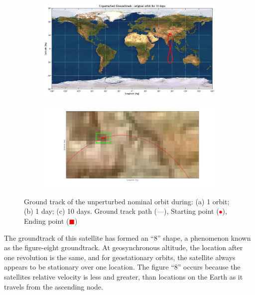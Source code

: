 \documentclass{article}
\newcommand{\reddashedline}{\textcolor{red}{---}}
\begin{document}
\begin{figure}[H]
	\vspace{1cm} %
	\begin{subfigure}[b]{0.45\textwidth}
		\includegraphics[width=\textwidth]{ug10d.eps}
		\caption{}
		\label{fig:1c}
	\end{subfigure}
	\hfill
	\begin{subfigure}[b]{0.45\textwidth}
		\includegraphics[width=\textwidth]{ugstartend.png}
		\caption{}
		\label{fig:1d}
	\end{subfigure}
	\caption{Ground track of the unperturbed nominal orbit during: (a) 1 orbit; (b) 1 day; (c) 10 days. Ground track path (\reddashedline), Starting point (\textcolor{red}{$\bullet$}), Ending point (\textcolor{red}{$\blacksquare$})
	}
\end{figure}


The groundtrack of this satellite has formed an “8” shape, a phenomenon known as the figure-eight groundtrack. At geosynchronous altitude, the location after one revolution is the same, and for geostationary  orbits, the satellite always appears to be stationary over one location. The figure “8” occurs because the satellites relative velocity is less and greater, than locations on the Earth as it travels from the ascending node. 
\end{document}
